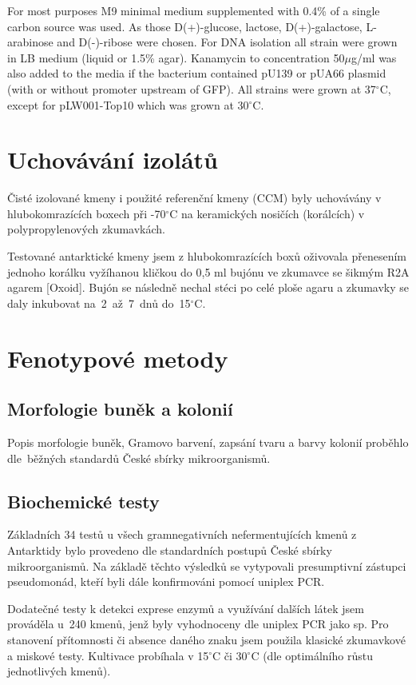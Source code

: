 For most purposes M9 minimal medium supplemented with 0.4\% of a single carbon source was used.
As those D(+)-glucose, lactose, D(+)-galactose, L-arabinose and D(-)-ribose were chosen.
For DNA isolation all strain were grown in LB medium (liquid or 1.5\% agar).
Kanamycin to concentration 50$\mu$g/ml was also added to the media if the bacterium contained pU139 or pUA66 plasmid (with or without promoter upstream of GFP).
All strains were grown at 37$^{\circ}$C, except for pLW001-Top10 which was grown at 30$^{\circ}$C.

\section{Uchovávání izolátů}
Čisté izolované kmeny i použité referenční kmeny (CCM) byly uchovávány v hlubokomrazících boxech při -70$^{\circ}$C na keramických nosičích (korálcích) v polypropylenových zkumavkách.

Testované antarktické kmeny jsem z hlubokomrazících boxů oživovala přenesením jednoho korálku vyžíhanou kličkou do 0,5 ml bujónu ve zkumavce se šikmým R2A agarem [Oxoid].
Bujón se následně nechal stéci po celé ploše agaru a zkumavky se daly inkubovat na~2~až~7~dnů do~15$^{\circ}$C.

\section{Fenotypové metody}
\subsection{Morfologie buněk a kolonií}
Popis morfologie buněk, Gramovo barvení, zapsání tvaru a barvy kolonií proběhlo dle~běžných standardů České sbírky mikroorganismů.

\subsection{Biochemické testy}
Základních 34 testů u všech gramnegativních nefermentujících kmenů z Antarktidy bylo provedeno dle standardních postupů České sbírky mikroorganismů.
Na základě těchto výsledků se vytypovali presumptivní zástupci pseudomonád, kteří byli dále konfirmováni pomocí uniplex PCR.

Dodatečné testy k detekci exprese enzymů a využívání dalších látek jsem prováděla u~240 kmenů, jenž byly vyhodnoceny dle uniplex PCR jako  sp.
Pro stanovení přítomnosti či absence daného znaku jsem použila klasické zkumavkové a miskové testy.
Kultivace probíhala v 15$^{\circ}$C či 30$^{\circ}$C (dle optimálního růstu jednotlivých kmenů).

